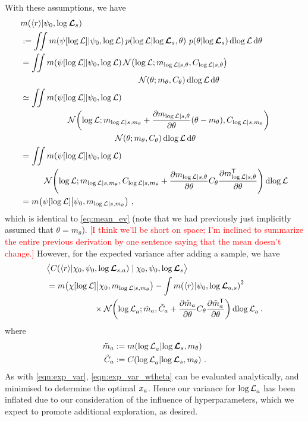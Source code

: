 \documentclass{article}
\begin{document}
With these assumptions, we have
\begin{align*}
& \mean{\inty{r}}{\psi_0,\tvr_s} \\
& \deq \iint \mean{\psi[\tr]}{\psi_0,\tr}
\p{\tr}{\tvr_s, \theta}\, \p{\theta}{\tvr_s}\ud \tr\,\ud \theta\\
& = \iint \mean{\psi[\tr]}{\psi_0,\tr} \N{\tr}{m_{\tr|s,\theta}}{C_{\tr|s,\theta}}
\\
& \hspace{5cm}\N{\theta}{m_\theta}{C_\theta}\ud \tr\,\ud \theta
\\
& \simeq \iint \mean{\psi[\tr]}{\psi_0,\tr} 
\\
& \hspace{2cm}\N{\tr}
{m_{\tr|s,m_\theta}+\pderiv{m_{\tr|s,\theta}}{\theta}(\theta-m_\theta)}
{C_{\tr|s,m_\theta}}
\\
& \hspace{4cm}
\N{\theta}{m_\theta}{C_\theta}\ud \tr\,\ud \theta
\\
& = \iint \mean{\psi[\tr]}{\psi_0,\tr} \\
& \hspace{1cm}\N{\tr}
{m_{\tr|s,m_\theta}}
{C_{\tr|s,m_\theta}+\pderiv{m_{\tr|s,\theta}}{\theta}C_\theta\pderiv{m\tra_{\tr|s,\theta}}{\theta}}
\ud \tr
\\
& = \mean{\psi[\tr]}{\psi_0,m_{\tr|s,m_\theta}}\,,
\end{align*}
which is identical to \eqref{eq:mean_ev} (note that we had previously just implicitly assumed that $\theta=m_\theta$). 
\textcolor{red}{[I think we'll be short on space; I'm inclined to summarize the entire previous derivation by one sentence saying that the mean doesn't change.]}
However, for the expected variance after adding a sample, we have
\begin{align}\label{eqn:exp_var_wtheta}
& \bigl\langle \cov{\langle r\rangle}{\chi_0,\psi_0,\tvr_{s,a}}\mid \chi_0,\psi_0,\tvr_{s}\bigr\rangle
\nonumber\\
& =  \mean{\chi[\tr]}{\chi_0,m_{\tr|s,m_\theta}}  - 
\int\mean{\inty{r}}{\psi_0,\tvr_{a,s}}^2
\nonumber\\
& \hspace{2cm}
\times\N{\tr_a}
{\tilde{m}_a }
{\tilde{C}_a +\pderiv{\tilde{m}_a}{\theta}C_\theta\pderiv{\tilde{m}\tra_a}{\theta}}
\ud\tr_a\,.
\end{align}
where
\begin{align*}
\tilde{m}_a & \deq \mean{\tr_a}{\tvr_s,m_\theta}\\
\tilde{C}_a & \deq \cov{\tr_a}{\tvr_s,m_\theta}\,.
\end{align*}
As with \eqref{eqn:exp_var}, \eqref{eqn:exp_var_wtheta} can be evaluated analytically, and minimised to determine the optimal $\lfv_a$.
Hence our variance for $\tr_a$ has been inflated due to our consideration of the influence of hyperparameters, which we expect to promote additional exploration, as desired.
\end{document}
